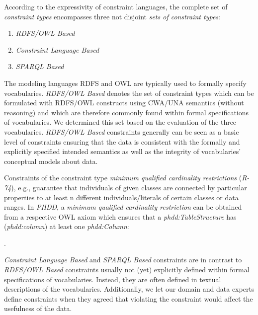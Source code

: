 \documentclass[conference]{IEEEtran}
\newcommand{\ms}[1]{\texttt{#1}}
\begin{document}
According to the expressivity of constraint languages, the complete set of \emph{constraint types} encompasses three not disjoint \emph{sets of constraint types}:
\begin{enumerate}
	\item \emph{RDFS/OWL Based}
	\item \emph{Constraint Language Based}
	\item \emph{SPARQL Based}
\end{enumerate}

The modeling languages RDFS and OWL are typically used to formally specify vocabularies. \emph{RDFS/OWL Based} denotes the set of constraint types which can be formulated with RDFS/OWL constructs using CWA/UNA semantics (without reasoning) and which are therefore commonly found within formal specifications of vocabularies. We determined this set based on the evaluation of the three vocabularies. \emph{RDFS/OWL Based} constraints generally can be seen as a basic level of constraints ensuring that the data is consistent with the formally and explicitly specified intended semantics as well as the integrity of vocabularies' conceptual models about data.

Constraints of the constraint type \emph{minimum qualified cardinality restrictions} (\emph{R-74}), e.g., guarantee that individuals of given classes are connected by particular properties to at least n different individuals/literals of certain classes or data ranges. In \emph{PHDD}, a \emph{minimum qualified cardinality restriction} can be obtained from a respective OWL axiom which ensures that a \emph{phdd:TableStructure} has (\emph{phdd:column}) at least one \emph{phdd:Column}:
\begin{ex}
 .
\end{ex}

\emph{Constraint Language Based} and \emph{SPARQL Based} constraints are in contrast to \emph{RDFS/OWL Based} constraints usually not (yet) explicitly defined within formal specifications of vocabularies. Instead, they are often defined in textual descriptions of the vocabularies. Additionally, we let our domain and data experts define constraints when they agreed that violating the constraint would affect the usefulness of the data.
\end{document}

